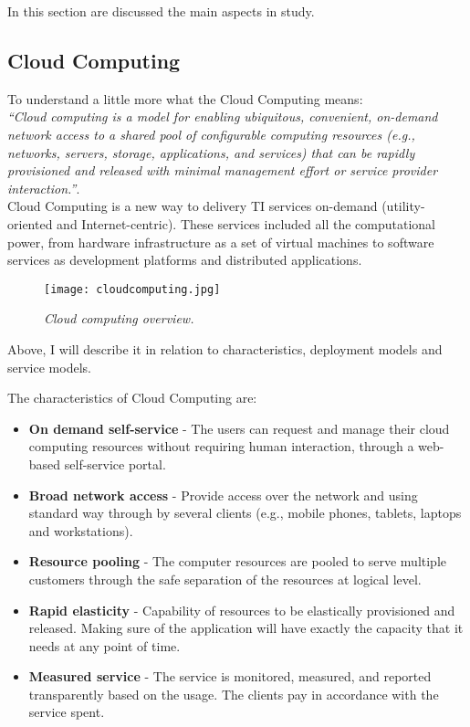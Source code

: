 In this section are discussed the main aspects in study.

\subsection{Cloud Computing}



To understand a little more what the Cloud Computing means:\\

\textit{``Cloud computing is a model for enabling ubiquitous, convenient, on-demand network access to a shared pool of configurable computing resources (e.g., networks, servers, storage, applications, and services) that can be rapidly provisioned and released with minimal management effort or service provider interaction.''}\cite{mell2011nist}.\\

Cloud Computing is a new way to delivery TI services on-demand (utility-oriented and Internet-centric). These services included all the computational power, from hardware infrastructure as a set of virtual machines to software services as development platforms and distributed applications.

\begin{figure}[!ht]
\begin{center}
\texttt{[image: cloudcomputing.jpg]}
\caption{\small \sl Cloud computing overview.\label{fig:cloudcomputing}}
\end{center}
\end{figure}

Above, I will describe it in relation to characteristics, deployment models and service models\cite{schouten2013ibm}.

The characteristics of Cloud Computing are:
\begin{itemize}
	\item \textbf{On demand self-service} 	- The users can request and manage their cloud computing resources without requiring human interaction, through a web-based self-service portal.
	\item \textbf{Broad network access 	}	- Provide access over the network and using standard way through by several clients (e.g., mobile phones, tablets, laptops and workstations).
	\item \textbf{Resource pooling 		}	- The computer resources are pooled to serve multiple customers through the safe separation of the resources at logical level.
	\item \textbf{Rapid elasticity 		}	- Capability of resources to be elastically provisioned and released. Making sure of the application will have exactly the capacity that it needs at any point of time.
	\item \textbf{Measured service 		}	- The service is monitored, measured, and reported transparently based on the usage. The clients pay in accordance with the service spent.
\end{itemize}

